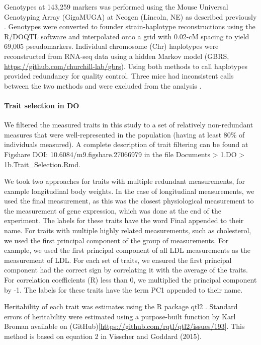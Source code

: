 \documentclass[
]{article}
\begin{document}
Genotypes at 143,259 markers was performed using the Mouse Universal
Genotyping Array (GigaMUGA) \cite{pmid26684931} at Neogen (Lincoln, NE)
as described previously \cite{pmid29567659, pmid22345611}. Genotypes
were converted to founder strain-haplotype reconstructions using the
R/DOQTL software \cite{pmid25237114} and interpolated onto a grid with
0.02-cM spacing to yield 69,005 pseudomarkers. Individual chromosome
(Chr) haplotypes were reconstructed from RNA-seq data using a hidden
Markov model \cite{choi2020genotype} (GBRS,
\url{https://github.com/churchill-lab/gbrs}). Using both methods to call
haplotypes provided redundancy for quality control. Three mice had
inconsistent calls between the two methods and were excluded from the
analysis \cite{pmid29567659}.

\paragraph{Trait selection in DO}\label{trait-selection-in-do}

We filtered the measured traits in this study to a set of relatively
non-redundant measures that were well-represented in the population
(having at least 80\% of individuals measured). A complete description
of trait filtering can be found at Figshare DOI:
10.6084/m9.figshare.27066979 \cite{cube_data} in the file Documents
\textgreater{} 1.DO \textgreater{} 1b.Trait\_Selection.Rmd.

We took two approaches for traits with multiple redundant measurements,
for example longitudinal body weights. In the case of longitudinal
measurements, we used the final measurement, as this was the closest
physiological measurement to the measurement of gene expression, which
was done at the end of the experiment. The labels for these traits have
the word Final appended to their name. For traits with multiple highly
related measurements, such as cholesterol, we used the first principal
component of the group of measurements. For example, we used the first
principal component of all LDL measurements as the measurement of LDL.
For each set of traits, we ensured the first principal component had the
correct sign by correlating it with the average of the traits. For
correlation coefficients (R) less than 0, we multiplied the principal
component by -1. The labels for these traits have the term PC1 appended
to their name.

Heritability of each trait was estimates using the R package qtl2
\cite{pmid30591514}. Standard errors of heritability were estimated
using a purpose-built function by Karl Broman available on
(GitHub){[}\url{https://github.com/rqtl/qtl2/issues/193}{]}. This method
is based on equation 2 in Visscher and Goddard
(2015)\cite{pmid25361897}.
\end{document}
